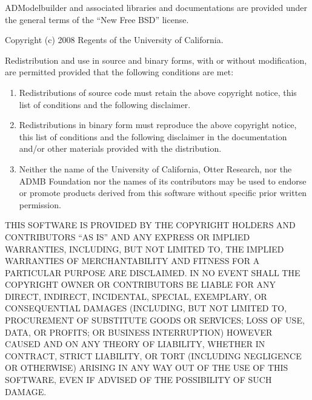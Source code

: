 ADModelbuilder and associated libraries and documentations are provided under the 
general terms of the ``New Free BSD'' license. 

Copyright (c) 2008 Regents of the University of California. 

Redistribution and use in source and binary forms, with or without modification, are 
permitted provided that the following conditions are met: 
\begin{enumerate}
\item Redistributions of source code must retain the above copyright notice, this list of 
conditions and the following disclaimer. 
\item Redistributions in binary form must reproduce the above copyright notice, this list 
of conditions and the following disclaimer in the documentation and/or other materials 
provided with the distribution. 
\item Neither the name of the University of California, Otter Research, nor the ADMB 
Foundation nor the names of its contributors may be used to endorse or promote products 
derived from this software without specific prior written permission. 
\end{enumerate}


THIS SOFTWARE IS PROVIDED BY THE COPYRIGHT HOLDERS AND CONTRIBUTORS ``AS IS'' AND ANY EXPRESS OR IMPLIED WARRANTIES, INCLUD\-ING, BUT NOT LIMITED TO, THE IMPLIED WARRANTIES OF MERCHANTABIL\-ITY AND FITNESS FOR A PARTICULAR PURPOSE ARE DISCLAIMED. IN NO EVENT SHALL THE COPYRIGHT OWNER OR CONTRIBUTORS BE LIABLE FOR ANY DIRECT, INDIRECT, INCIDENTAL, SPECIAL, EXEMPLARY, OR CONSEQUEN\-TIAL DAMAGES (INCLUDING, BUT NOT LIMITED TO, PROCUREMENT OF SUBSTITUTE GOODS OR SERVICES; LOSS OF USE, DATA, OR PROFITS; OR BUSI\-NESS INTERRUPTION) HOWEVER CAUSED AND ON ANY THEORY OF LIABIL\-ITY, WHETH\-ER IN CONTRACT, STRICT LIABILITY, OR TORT (INCLUDING NEG\-LIGENCE OR OTHERWISE) ARISING IN ANY WAY OUT OF THE USE OF THIS SOFTWARE, EVEN IF ADVISED OF THE POSSIBILITY OF SUCH DAMAGE. 